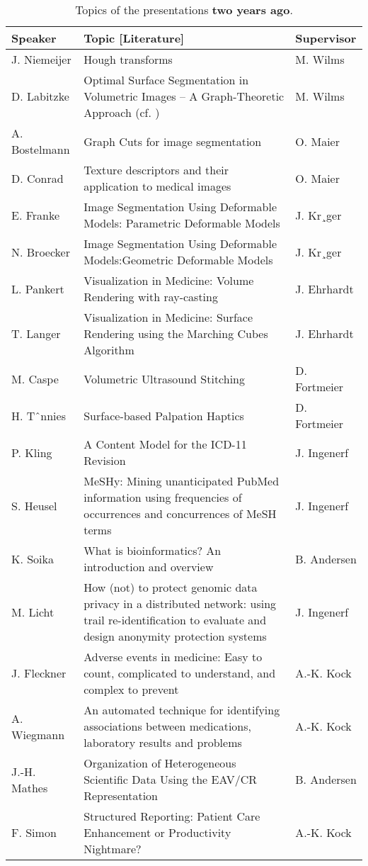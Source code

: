 \documentclass[
12pt,
headsepline,
bibliography=totoc,
twoside=semi,
fleqn
]{scrartcl}
\begin{document}
\begin{table}[t]
\footnotesize
\caption{\label{tab:table1} Topics of the presentations \textbf{two years ago}.}
\vspace{1ex}
\centering 
\begin{tabular}{p{2.5cm}p{8.7cm}p{2.8cm}}
\toprule
\textbf{Speaker} & \textbf{Topic [Literature]} & \textbf{Supervisor} \\
\midrule
J. Niemeijer & Hough transforms & M. Wilms \\
D. Labitzke & Optimal Surface Segmentation in Volumetric Images -- A Graph-Theoretic Approach (cf. \citep{Li_TPAMI_2006}) & M. Wilms \\
A. Bostelmann & Graph Cuts for image segmentation
 & O. Maier \\
D. Conrad & Texture descriptors and their application to medical images & O. Maier
 \\
E. Franke & Image Segmentation Using Deformable Models: Parametric Deformable
Models & J. Kr¸ger \\
N. Broecker & Image Segmentation Using Deformable Models:Geometric Deformable
Models & J. Kr¸ger \\
L. Pankert & Visualization in Medicine: Volume Rendering with ray-casting
 & J. Ehrhardt \\
T. Langer & Visualization in Medicine: Surface Rendering using the Marching Cubes
Algorithm & J. Ehrhardt \\
M. Caspe & Volumetric Ultrasound Stitching & D. Fortmeier \\
H. Tˆnnies & Surface-based Palpation Haptics & D. Fortmeier \\
\midrule
P. Kling & A Content Model for the ICD-11 Revision & J. Ingenerf \\
S. Heusel & MeSHy: Mining unanticipated PubMed information using frequencies of
occurrences and concurrences of MeSH terms & J. Ingenerf \\
K. Soika & What is bioinformatics? An introduction and overview & B. Andersen \\
M. Licht & How (not) to protect genomic data privacy in a distributed network: using trail
re-identification to evaluate and design anonymity protection systems & J. Ingenerf \\
J. Fleckner & Adverse events in medicine: Easy to count, complicated to understand, and
complex to prevent & A.-K. Kock \\
A. Wiegmann & An automated technique for identifying associations between medications,
laboratory results and problems & A.-K. Kock \\
J.-H. Mathes & Organization of Heterogeneous Scientific Data Using the EAV/CR
Representation & B. Andersen\\
F. Simon & Structured Reporting: Patient Care Enhancement or Productivity Nightmare? & A.-K. Kock\\
\bottomrule
\end{tabular}
\vspace{2ex}
\end{table}


\newpage
%

\footnotesize
\end{document}
